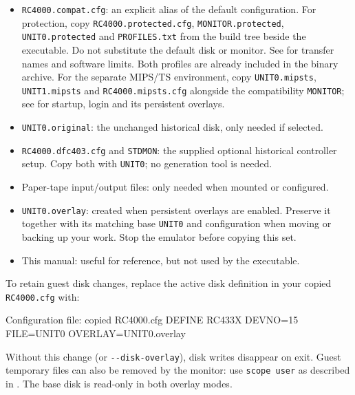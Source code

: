 \begin{itemize}
\tightlist
\item
  \texttt{RC4000.compat.cfg}: an explicit alias of the default configuration.
  For protection, copy \texttt{RC4000.protected.cfg},
  \texttt{MONITOR.protected}, \texttt{UNIT0.protected} and \texttt{PROFILES.txt} from the build tree
  beside the executable. Do not substitute the default disk or monitor. See
  for transfer names and software limits. Both profiles are already included
  in the binary archive. For the separate MIPS/TS environment, copy
  \texttt{UNIT0.mipsts}, \texttt{UNIT1.mipsts} and \texttt{RC4000.mipsts.cfg}
  alongside the compatibility \texttt{MONITOR}; see
   for startup, login and its persistent overlays.
\item
  \passthrough{\lstinline!UNIT0.original!}: the unchanged historical disk, only needed if selected.
\item
  \passthrough{\lstinline!RC4000.dfc403.cfg!} and \passthrough{\lstinline!STDMON!}: the supplied optional historical controller setup. Copy both with \passthrough{\lstinline!UNIT0!}; no generation tool is needed.
\item
  Paper-tape input/output files: only needed when mounted or configured.
\item
  \passthrough{\lstinline!UNIT0.overlay!}: created when persistent overlays are enabled. Preserve it together with its matching base \passthrough{\lstinline!UNIT0!} and configuration when moving or backing up your work. Stop the emulator before copying this set.
\item
  This manual: useful for reference, but not used by the executable.
\end{itemize}

To retain guest disk changes, replace the active disk definition in your copied \passthrough{\lstinline!RC4000.cfg!} with:

\begin{commandexample}{Configuration file: copied RC4000.cfg}
DEFINE RC433X DEVNO=15 FILE=UNIT0 OVERLAY=UNIT0.overlay
\end{commandexample}

Without this change (or \passthrough{\lstinline!--disk-overlay!}), disk writes disappear on exit. Guest temporary files can also be removed by the monitor: use \passthrough{\lstinline!scope user!} as described in . The base disk is read-only in both overlay modes.

